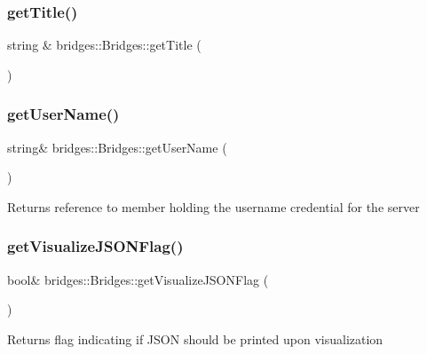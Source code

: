 \subsubsection{\texorpdfstring{get\+Title()}{getTitle()}}
{\footnotesize\ttfamily string \& bridges\+::\+Bridges\+::get\+Title (\begin{DoxyParamCaption}{ }\end{DoxyParamCaption})}

\mbox{\label{namespacebridges_1_1_bridges_a5cdf80d7e18a2ed6beac76458b9e0900}} 
\subsubsection{\texorpdfstring{get\+User\+Name()}{getUserName()}}
{\footnotesize\ttfamily string\& bridges\+::\+Bridges\+::get\+User\+Name (\begin{DoxyParamCaption}{ }\end{DoxyParamCaption})}

\begin{DoxyReturn}{Returns}
reference to member holding the username credential for the server 
\end{DoxyReturn}
\mbox{\label{namespacebridges_1_1_bridges_aedeca8599cd765918f2a612834c6fff0}} 
\subsubsection{\texorpdfstring{get\+Visualize\+J\+S\+O\+N\+Flag()}{getVisualizeJSONFlag()}}
{\footnotesize\ttfamily bool\& bridges\+::\+Bridges\+::get\+Visualize\+J\+S\+O\+N\+Flag (\begin{DoxyParamCaption}{ }\end{DoxyParamCaption})}

\begin{DoxyReturn}{Returns}
flag indicating if J\+S\+ON should be printed upon visualization 
\end{DoxyReturn}
\mbox{\label{namespacebridges_1_1_bridges_a10272250ed6f4bb8281dcaecc61fa698}} 
